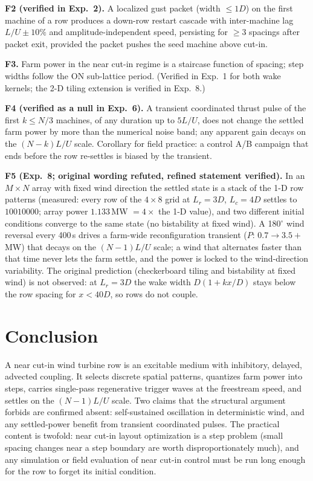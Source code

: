 \documentclass[11pt]{article}
\begin{document}
\textbf{F2 (verified in Exp.~2).} A localized gust packet (width $\le 1D$) on the first
machine of a row produces a down-row restart cascade with inter-machine lag $L/U\pm10\%$
and amplitude-independent speed, persisting for $\ge 3$ spacings after packet exit, provided
the packet pushes the seed machine above cut-in.

\textbf{F3.} Farm power in the near cut-in regime is a staircase function of spacing; step
widths follow the ON sub-lattice period. (Verified in Exp.~1 for both wake kernels; the 2-D tiling extension is verified in Exp.~8.)

\textbf{F4 (verified as a null in Exp.~6).} A transient coordinated thrust pulse of the
first $k\le N/3$ machines, of any duration up to $5L/U$, does not change the settled farm
power by more than the numerical noise band; any apparent gain decays on the
$(N-k)L/U$ scale. Corollary for field practice: a control A/B campaign that ends before the
row re-settles is biased by the transient.

\textbf{F5 (Exp.~8; original wording refuted, refined statement verified).} In an $M\times N$
array with fixed wind direction the settled state is a stack of the 1-D row patterns (measured:
every row of the $4\times 8$ grid at $L_r=3D$, $L_c=4D$ settles to $10010000$; array power
$1.133$\,MW $= 4\times$ the 1-D value), and two different initial conditions converge to the same
state (no bistability at fixed wind). A 180$^\circ$ wind reversal every 400\,s drives a
farm-wide reconfiguration transient ($P$: $0.7\to 3.5+$\,MW) that decays on the
$(N-1)L/U$ scale; a wind that alternates faster than that time never lets the farm settle, and
the power is locked to the wind-direction variability. The original prediction (checkerboard
tiling and bistability at fixed wind) is not observed: at $L_r=3D$ the wake width
$D(1+kx/D)$ stays below the row spacing for $x<40D$, so rows do not couple.

\section{Conclusion}

A near cut-in wind turbine row is an excitable medium with inhibitory, delayed, advected
coupling. It selects discrete spatial patterns, quantizes farm power into steps, carries
single-pass regenerative trigger waves at the freestream speed, and settles on the
$(N-1)L/U$ scale. Two claims that the structural argument forbids are confirmed absent:
self-sustained oscillation in deterministic wind, and any settled-power benefit from
transient coordinated pulses. The practical content is twofold: near cut-in layout
optimization is a step problem (small spacing changes near a step boundary are worth
disproportionately much), and any simulation or field evaluation of near cut-in control must
be run long enough for the row to forget its initial condition.
\end{document}
